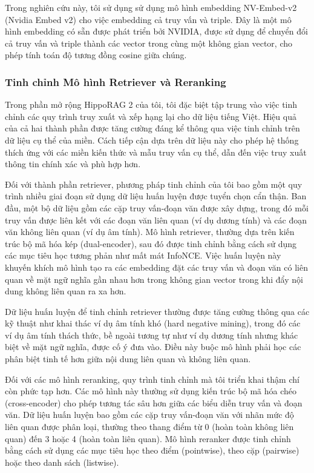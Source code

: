 \documentclass[../main.tex]{subfiles}
\begin{document}
Trong nghiên cứu này, tôi sử dụng sử dụng mô hình embedding NV-Embed-v2 (Nvidia Embed v2) cho việc embedding cả truy vấn và triple. Đây là một mô hình embedding có sẵn được phát triển bởi NVIDIA, được sử dụng để chuyển đổi cả truy vấn và triple thành các vector trong cùng một không gian vector, cho phép tính toán độ tương đồng cosine giữa chúng.



\subsubsection{Tinh chỉnh Mô hình Retriever và Reranking}
Trong phần mở rộng HippoRAG 2 của tôi, tôi đặc biệt tập trung vào việc tinh chỉnh các quy trình truy xuất và xếp hạng lại cho dữ liệu tiếng Việt. Hiệu quả của cả hai thành phần được tăng cường đáng kể thông qua việc tinh chỉnh trên dữ liệu cụ thể của miền. Cách tiếp cận dựa trên dữ liệu này cho phép hệ thống thích ứng với các miền kiến thức và mẫu truy vấn cụ thể, dẫn đến việc truy xuất thông tin chính xác và phù hợp hơn.

Đối với thành phần retriever, phương pháp tinh chỉnh của tôi bao gồm một quy trình nhiều giai đoạn sử dụng dữ liệu huấn luyện được tuyển chọn cẩn thận. Ban đầu, một bộ dữ liệu gồm các cặp truy vấn-đoạn văn được xây dựng, trong đó mỗi truy vấn được liên kết với các đoạn văn liên quan (ví dụ dương tính) và các đoạn văn không liên quan (ví dụ âm tính). Mô hình retriever, thường dựa trên kiến trúc bộ mã hóa kép (dual-encoder), sau đó được tinh chỉnh bằng cách sử dụng các mục tiêu học tương phản như mất mát InfoNCE. Việc huấn luyện này khuyến khích mô hình tạo ra các embedding đặt các truy vấn và đoạn văn có liên quan về mặt ngữ nghĩa gần nhau hơn trong không gian vector trong khi đẩy nội dung không liên quan ra xa hơn.

Dữ liệu huấn luyện để tinh chỉnh retriever thường được tăng cường thông qua các kỹ thuật như khai thác ví dụ âm tính khó (hard negative mining), trong đó các ví dụ âm tính thách thức, bề ngoài tương tự như ví dụ dương tính nhưng khác biệt về mặt ngữ nghĩa, được cố ý đưa vào. Điều này buộc mô hình phải học các phân biệt tinh tế hơn giữa nội dung liên quan và không liên quan. 

Đối với các mô hình reranking, quy trình tinh chỉnh mà tôi triển khai thậm chí còn phức tạp hơn. Các mô hình này thường sử dụng kiến trúc bộ mã hóa chéo (cross-encoder) cho phép tương tác sâu hơn giữa các biểu diễn truy vấn và đoạn văn. Dữ liệu huấn luyện bao gồm các cặp truy vấn-đoạn văn với nhãn mức độ liên quan được phân loại, thường theo thang điểm từ 0 (hoàn toàn không liên quan) đến 3 hoặc 4 (hoàn toàn liên quan). Mô hình reranker được tinh chỉnh bằng cách sử dụng các mục tiêu học theo điểm (pointwise), theo cặp (pairwise) hoặc theo danh sách (listwise).
\end{document}

